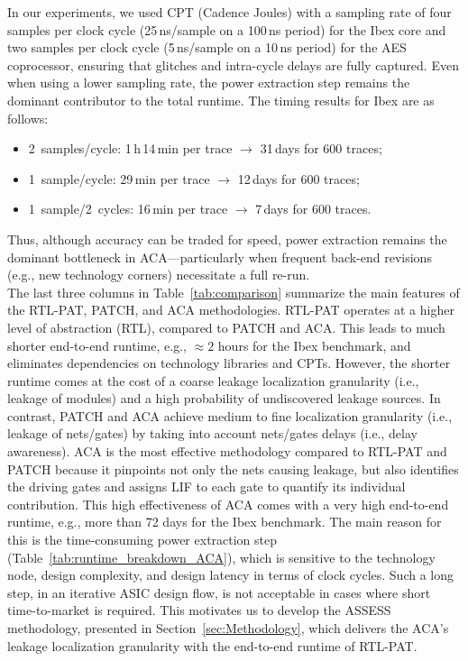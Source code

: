\documentclass[sigconf]{acmart}
\newcommand{\methodname}{ASSESS}
\begin{document}
In our experiments, we used CPT (Cadence Joules) with a sampling rate of four samples per clock cycle (25\,ns/sample on a 100\,ns period) for the Ibex core and two samples per clock cycle (5\,ns/sample on a 10\,ns period) for the AES coprocessor, ensuring that glitches and intra-cycle delays are fully captured. Even when using a lower sampling rate, the power extraction step remains the dominant contributor to the total runtime. The timing results for Ibex are as follows:
\begin{itemize}[leftmargin=1.5em, nosep]%
  \item 2~samples/cycle: 1\,h\,14\,min per trace  
        \(\rightarrow\) 31\,days for 600 traces;
  \item 1~sample/cycle: 29\,min per trace  
        \(\rightarrow\) 12\,days for 600 traces;
  \item 1~sample/2~cycles: 16\,min per trace  
        \(\rightarrow\) 7\,days for 600 traces.
\end{itemize}
Thus, although accuracy can be traded for speed, power extraction remains the dominant bottleneck in ACA—particularly when frequent back-end revisions (e.g., new technology corners) necessitate a full re-run.\\



The last three columns in Table~\ref{tab:comparison} summarize the main features of the RTL-PAT, PATCH, and ACA methodologies. RTL-PAT operates at a higher level of abstraction (RTL), compared to PATCH and ACA. This leads to much shorter end-to-end runtime, e.g., $\approx 2$ hours for the Ibex benchmark, and eliminates dependencies on technology libraries and CPTs. However, the shorter runtime comes at the cost of a coarse leakage localization granularity (i.e., leakage of modules) and a high probability of undiscovered leakage sources. In contrast, PATCH and ACA achieve medium to fine localization granularity (i.e., leakage of nets/gates) by taking into account nets/gates delays (i.e., delay awareness). ACA is the most effective methodology compared to RTL-PAT and PATCH because it pinpoints not only the nets causing leakage, but also identifies the driving gates and assigns LIF to each gate to quantify its individual contribution. This high effectiveness of ACA comes with a very high end-to-end runtime, e.g., more than 72 days for the Ibex benchmark. The main reason for this is the time-consuming power extraction step (Table~\ref{tab:runtime_breakdown_ACA}), which is sensitive to the technology node, design complexity, and design latency in terms of clock cycles. Such a long step, in an iterative ASIC design flow, is not acceptable in cases where short time-to-market is required. 
This motivates us to develop the \methodname{} methodology, presented in Section~\ref{sec:Methodology}, which delivers the ACA's leakage localization granularity with the end-to-end runtime of RTL-PAT.
\end{document}
